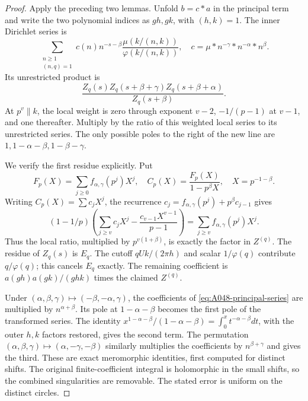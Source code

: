 \begin{proof}
Apply the preceding two lemmas. Unfold \(b=c*a\)
in the principal term and write the two polynomial
indices as \(gh,gk\), with \((h,k)=1\).
The inner Dirichlet series is
\begin{equation}\label{eq:A048-principal-series}
 \sum_{\substack{n\ge1\\(n,q)=1}}
    c(n)n^{-s-\beta}
       \frac{\mu(k/(n,k))}{\varphi(k/(n,k))},
       \quad c=\mu*n^{-\gamma}*n^{-\alpha}*n^\beta.
\end{equation}
Its unrestricted product is
\[
 \frac{Z_q(s)Z_q(s+\beta+\gamma)Z_q(s+\beta+\alpha)}
      {Z_q(s+\beta)}.
\]
At \(p^v\parallel k\), the local weight is zero
through exponent \(v-2\), \(-1/(p-1)\) at \(v-1\),
and one thereafter. Multiply by the ratio of this
weighted local series to its unrestricted series.
The only possible poles to the right of the new
line are \(1,1-\alpha-\beta,1-\beta-\gamma\).

We verify the first residue explicitly. Put
\[
 F_p(X)=\sum_{j\ge0}f_{\alpha,\gamma}(p^j)X^j,
 \quad C_p(X)=\frac{F_p(X)}{1-p^\beta X},
 \quad X=p^{-1-\beta}.
\]
Writing \(C_p(X)=\sum c_jX^j\), the recurrence
\(c_j=f_{\alpha,\gamma}(p^j)+p^\beta c_{j-1}\)
gives
\[
 (1-1/p)\left(\sum_{j\ge v}c_jX^j
                  -\frac{c_{v-1}X^{v-1}}{p-1}\right)
             =\sum_{j\ge v}f_{\alpha,\gamma}(p^j)X^j.
\]
Thus the local ratio, multiplied by
\(p^{v(1+\beta)}\), is exactly the factor in
\(Z^{(q)}\). The residue of \(Z_q(s)\) is \(E_q\).
The cutoff \(qUk/(2\pi h)\) and scalar
\(1/\varphi(q)\) contribute \(q/\varphi(q)\);
this cancels \(E_q\) exactly. The remaining
coefficient is \(a(gh)a(gk)/(ghk)\) times the
claimed \(Z^{(q)}\).

Under
\((\alpha,\beta,\gamma)\mapsto(-\beta,-\alpha,\gamma)\),
the coefficients of \eqref{eq:A048-principal-series}
are multiplied by \(n^{\alpha+\beta}\).
Its pole at \(1-\alpha-\beta\) becomes the first
pole of the transformed series. The identity
\(x^{1-\alpha-\beta}/(1-\alpha-\beta)
=\int_0^x t^{-\alpha-\beta}dt\), with the outer
\(h,k\) factors restored, gives the second term.
The permutation
\((\alpha,\beta,\gamma)\mapsto(\alpha,-\gamma,-\beta)\)
similarly multiplies the coefficients by
\(n^{\beta+\gamma}\) and gives the third.
These are exact meromorphic identities, first
computed for distinct shifts. The original
finite-coefficient integral is holomorphic in
the small shifts, so the combined singularities
are removable. The stated error is uniform
on the distinct circles.
\end{proof}


